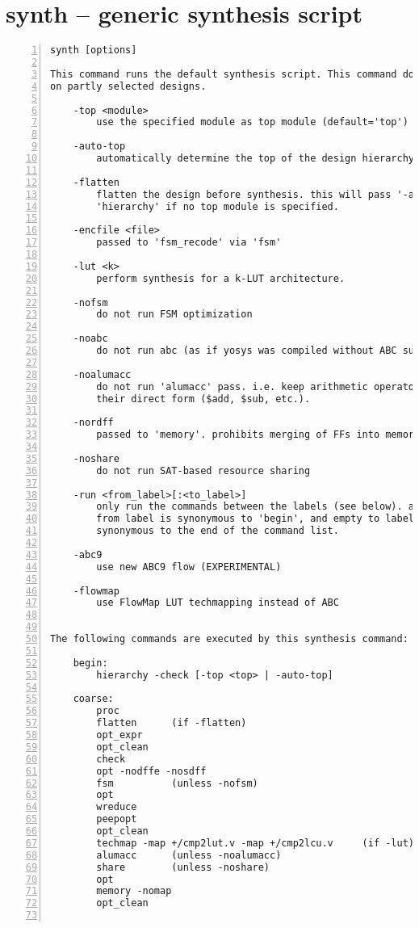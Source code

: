 \section{synth -- generic synthesis script}
\label{cmd:synth}
\begin{lstlisting}[numbers=left,frame=single]
    synth [options]

This command runs the default synthesis script. This command does not operate
on partly selected designs.

    -top <module>
        use the specified module as top module (default='top')

    -auto-top
        automatically determine the top of the design hierarchy

    -flatten
        flatten the design before synthesis. this will pass '-auto-top' to
        'hierarchy' if no top module is specified.

    -encfile <file>
        passed to 'fsm_recode' via 'fsm'

    -lut <k>
        perform synthesis for a k-LUT architecture.

    -nofsm
        do not run FSM optimization

    -noabc
        do not run abc (as if yosys was compiled without ABC support)

    -noalumacc
        do not run 'alumacc' pass. i.e. keep arithmetic operators in
        their direct form ($add, $sub, etc.).

    -nordff
        passed to 'memory'. prohibits merging of FFs into memory read ports

    -noshare
        do not run SAT-based resource sharing

    -run <from_label>[:<to_label>]
        only run the commands between the labels (see below). an empty
        from label is synonymous to 'begin', and empty to label is
        synonymous to the end of the command list.

    -abc9
        use new ABC9 flow (EXPERIMENTAL)

    -flowmap
        use FlowMap LUT techmapping instead of ABC


The following commands are executed by this synthesis command:

    begin:
        hierarchy -check [-top <top> | -auto-top]

    coarse:
        proc
        flatten      (if -flatten)
        opt_expr
        opt_clean
        check
        opt -nodffe -nosdff
        fsm          (unless -nofsm)
        opt
        wreduce
        peepopt
        opt_clean
        techmap -map +/cmp2lut.v -map +/cmp2lcu.v     (if -lut)
        alumacc      (unless -noalumacc)
        share        (unless -noshare)
        opt
        memory -nomap
        opt_clean


\end{lstlisting}
